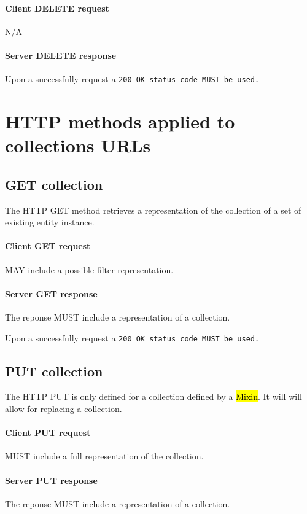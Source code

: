 \documentclass[10pt,a4paper]{article}
\begin{document}
\paragraph{Client DELETE request}
N/A

\paragraph{Server DELETE response}
Upon a successfully request a \tt{200 OK} status code MUST be used.

\section{HTTP methods applied to collections URLs}

\subsection{GET collection}
The HTTP GET method retrieves a representation of the collection of a set of existing entity instance.

\paragraph{Client GET request}
MAY include a possible filter representation.

\paragraph{Server GET response}
The reponse MUST include a representation of a collection.

Upon a successfully request a \tt{200 OK} status code MUST be used.

\subsection{PUT collection}
The HTTP PUT is only defined for a collection defined by a \hl{Mixin}. It will will allow for replacing a collection.

\paragraph{Client PUT request}
MUST include a full representation of the collection.

\paragraph{Server PUT response}
The reponse MUST include a representation of a collection.
\end{document}
